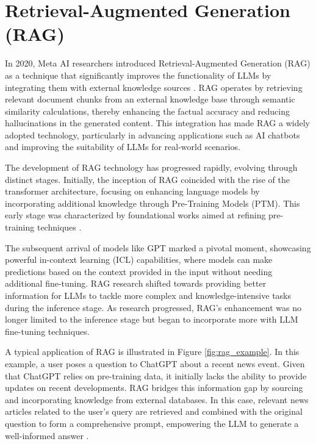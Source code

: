 \section{Retrieval-Augmented Generation (RAG)}

In 2020, Meta AI researchers introduced Retrieval-Augmented Generation (RAG) as a technique that significantly improves the functionality of LLMs by integrating them with external knowledge sources \cite{lewis2020retrieval}. RAG operates by retrieving relevant document chunks from an external knowledge base through semantic similarity calculations, thereby enhancing the factual accuracy and reducing hallucinations in the generated content. This integration has made RAG a widely adopted technology, particularly in advancing applications such as AI chatbots and improving the suitability of LLMs for real-world scenarios.

The development of RAG technology has progressed rapidly, evolving through distinct stages. Initially, the inception of RAG coincided with the rise of the transformer architecture, focusing on enhancing language models by incorporating additional knowledge through Pre-Training Models (PTM). This early stage was characterized by foundational works aimed at refining pre-training techniques \cite{arora2023gar, lewis2020retrieval, borgeaud2022improving}. 

The subsequent arrival of models like GPT marked a pivotal moment, showcasing powerful in-context learning (ICL) capabilities, where models can make predictions based on the context provided in the input without needing additional fine-tuning. RAG research shifted towards providing better information for LLMs to tackle more complex and knowledge-intensive tasks during the inference stage. As research progressed, RAG’s enhancement was no longer limited to the inference stage but began to incorporate more with LLM fine-tuning techniques.

A typical application of RAG is illustrated in Figure \ref{fig:rag_example}. In this example, a user poses a question to ChatGPT about a recent news event. Given that ChatGPT relies on pre-training data, it initially lacks the ability to provide updates on recent developments. RAG bridges this information gap by sourcing and incorporating knowledge from external databases. In this case, relevant news articles related to the user's query are retrieved and combined with the original question to form a comprehensive prompt, empowering the LLM to generate a well-informed answer \cite{gao2023retrieval}.

